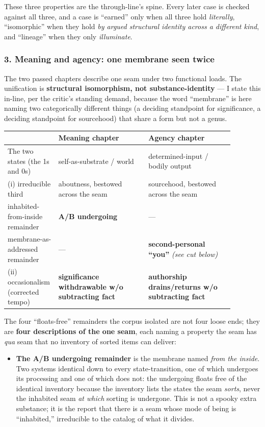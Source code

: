 \documentclass[11pt]{article}
\begin{document}
These three properties are the through-line's spine. Every later case is checked against all three, and a case is ``earned'' only when all three hold \emph{literally}, ``isomorphic'' when they hold \emph{by argued structural identity across a different kind}, and ``lineage'' when they only \emph{illuminate}.

\subsubsection*{3. Meaning and agency: one membrane seen twice}

The two passed chapters describe one seam under two functional loads. The unification is \textbf{structural isomorphism, not substance-identity} — I state this in-line, per the critic's standing demand, because the word ``membrane'' is here naming two categorically different things (a deciding standpoint for significance, a deciding standpoint for sourcehood) that share a form but not a genus.

{\small\begin{longtable}{>{\raggedright\arraybackslash}p{0.136\linewidth}>{\raggedright\arraybackslash}p{0.381\linewidth}>{\raggedright\arraybackslash}p{0.363\linewidth}}
\toprule
\textbf{} & \textbf{\textbf{Meaning chapter}} & \textbf{\textbf{Agency chapter}} \\ \midrule\endhead
The two states (the 1s and 0s) & self-as-substrate /\allowbreak{} world & determined-input /\allowbreak{} bodily output \\
(i) irreducible third & aboutness, bestowed across the seam & sourcehood, bestowed across the seam \\
inhabited-from-inside remainder & \textbf{A/\allowbreak{}B undergoing} & — \\
membrane-as-addressed remainder & — & \textbf{second-personal ``you''} \emph{(see cut below)} \\
(ii) occasionalism (corrected tempo) & \textbf{significance withdrawable w/\allowbreak{}o subtracting fact} & \textbf{authorship drains/\allowbreak{}returns w/\allowbreak{}o subtracting fact} \\
\bottomrule\end{longtable}}

The four ``floats-free'' remainders the corpus isolated are not four loose ends; they are \textbf{four descriptions of the one seam}, each naming a property the seam has \emph{qua} seam that no inventory of sorted items can deliver:

\begin{itemize}
\item \textbf{The A/\allowbreak{}B undergoing remainder} is the membrane named \emph{from the inside}. Two systems identical down to every state-transition, one of which undergoes its processing and one of which does not: the undergoing floats free of the identical inventory because the inventory lists the states the seam \emph{sorts}, never the inhabited seam \emph{at which} sorting is undergone. This is not a spooky extra substance; it is the report that there is a seam whose mode of being is ``inhabited,'' irreducible to the catalog of what it divides.
\end{itemize}
\end{document}
